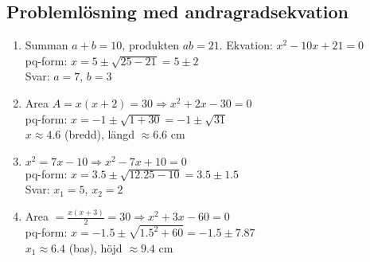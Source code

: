 \documentclass[a4paper,11pt]{article}
\begin{document}
\subsection*{Problemlösning med andragradsekvation}
\begin{enumerate}[label=\textbf{\arabic*.}]
    \item Summan $a + b = 10$, produkten $ab = 21$.
    \newline Ekvation: $x^2 - 10x + 21 = 0$\\
    pq-form: $x = 5 \pm \sqrt{25 - 21} = 5 \pm 2$\\
    Svar: $a = 7$, $b = 3$
    \item Area $A = x(x+2) = 30 \Rightarrow x^2 + 2x - 30 = 0$\\
    pq-form: $x = -1 \pm \sqrt{1 + 30} = -1 \pm \sqrt{31}$\\
    $x \approx 4.6$ (bredd), längd $\approx 6.6$ cm
    \item $x^2 = 7x - 10 \Rightarrow x^2 - 7x + 10 = 0$\\
    pq-form: $x = 3.5 \pm \sqrt{12.25 - 10} = 3.5 \pm 1.5$\\
    Svar: $x_1 = 5$, $x_2 = 2$
    \item Area $= \frac{x(x+3)}{2} = 30 \Rightarrow x^2 + 3x - 60 = 0$\\
    pq-form: $x = -1.5 \pm \sqrt{1.5^2 + 60} = -1.5 \pm 7.87$\\
    $x_1 \approx 6.4$ (bas), höjd $\approx 9.4$ cm
\end{enumerate}
\end{document}
